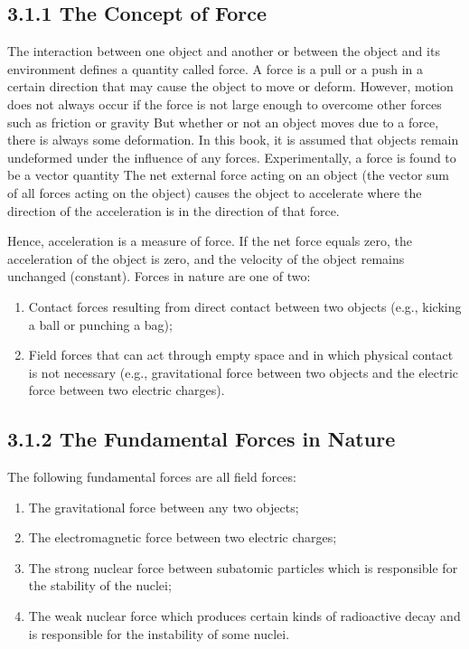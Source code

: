 \documentclass[10pt]{article}
\begin{document}
\subsection*{3.1.1 The Concept of Force}
The interaction between one object and another or between the object and its environment defines a quantity called force. A force is a pull or a push in a certain direction that may cause the object to move or deform. However, motion does not always occur if the force is not large enough to overcome other forces such as friction or gravity But whether or not an object moves due to a force, there is always some deformation. In this book, it is assumed that objects remain undeformed under the influence of any forces. Experimentally, a force is found to be a vector quantity The net external force acting on an object (the vector sum of all forces acting on the object) causes the object to accelerate where the direction of the acceleration is in the direction of that force.

Hence, acceleration is a measure of force. If the net force equals zero, the acceleration of the object is zero, and the velocity of the object remains unchanged (constant). Forces in nature are one of two:

\begin{enumerate}
  \item Contact forces resulting from direct contact between two objects (e.g., kicking a ball or punching a bag);
  \item Field forces that can act through empty space and in which physical contact is not necessary (e.g., gravitational force between two objects and the electric force between two electric charges).
\end{enumerate}

\subsection*{3.1.2 The Fundamental Forces in Nature}
The following fundamental forces are all field forces:

\begin{enumerate}
  \item The gravitational force between any two objects;
  \item The electromagnetic force between two electric charges;
  \item The strong nuclear force between subatomic particles which is responsible for the stability of the nuclei;
  \item The weak nuclear force which produces certain kinds of radioactive decay and is responsible for the instability of some nuclei.
\end{enumerate}
\end{document}
